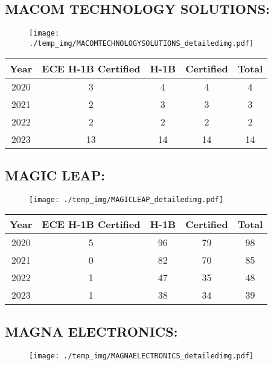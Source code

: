 \documentclass{article}%
\begin{document}
%
\newpage%
\subsection{MACOM TECHNOLOGY SOLUTIONS:}%
\label{subsec:MACOMTECHNOLOGYSOLUTIONS}%
\label{MACOMTECHNOLOGYSOLUTIONSdetailed}%


\begin{figure}[htbp]%
\centering%
\texttt{[image: ./temp\_img/MACOMTECHNOLOGYSOLUTIONS\_detailedimg.pdf]}%
\end{figure}

%
\begin{longtable}{c|c|c|c|c}%
\hline%
Year&ECE H{-}1B Certified&H{-}1B&Certified&Total\\%
\hline%
2020&3&4&4&4\\%
\hline%
2021&2&3&3&3\\%
\hline%
2022&2&2&2&2\\%
\hline%
2023&13&14&14&14\\%
\hline%
\end{longtable}

%
\newpage%
\subsection{MAGIC LEAP:}%
\label{subsec:MAGICLEAP}%
\label{MAGICLEAPdetailed}%


\begin{figure}[htbp]%
\centering%
\texttt{[image: ./temp\_img/MAGICLEAP\_detailedimg.pdf]}%
\end{figure}

%
\begin{longtable}{c|c|c|c|c}%
\hline%
Year&ECE H{-}1B Certified&H{-}1B&Certified&Total\\%
\hline%
2020&5&96&79&98\\%
\hline%
2021&0&82&70&85\\%
\hline%
2022&1&47&35&48\\%
\hline%
2023&1&38&34&39\\%
\hline%
\end{longtable}

%
\newpage%
\subsection{MAGNA ELECTRONICS:}%
\label{subsec:MAGNAELECTRONICS}%
\label{MAGNAELECTRONICSdetailed}%


\begin{figure}[htbp]%
\centering%
\texttt{[image: ./temp\_img/MAGNAELECTRONICS\_detailedimg.pdf]}%
\end{figure}
\end{document}
